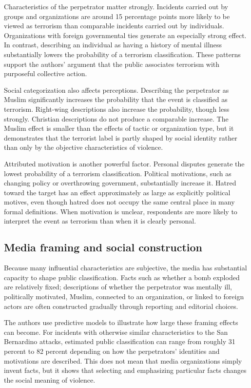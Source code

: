 Characteristics of the perpetrator matter strongly. Incidents carried out by groups and organizations are around 15 percentage points more likely to be viewed as terrorism than comparable incidents carried out by individuals. Organizations with foreign governmental ties generate an especially strong effect. In contrast, describing an individual as having a history of mental illness substantially lowers the probability of a terrorism classification. These patterns support the authors' argument that the public associates terrorism with purposeful collective action.

Social categorization also affects perceptions. Describing the perpetrator as Muslim significantly increases the probability that the event is classified as terrorism. Right-wing descriptions also increase the probability, though less strongly. Christian descriptions do not produce a comparable increase. The Muslim effect is smaller than the effects of tactic or organization type, but it demonstrates that the terrorist label is partly shaped by social identity rather than only by the objective characteristics of violence.

Attributed motivation is another powerful factor. Personal disputes generate the lowest probability of a terrorism classification. Political motivations, such as changing policy or overthrowing government, substantially increase it. Hatred toward the target has an effect approximately as large as explicitly political motives, even though hatred does not occupy the same central place in many formal definitions. When motivation is unclear, respondents are more likely to interpret the event as terrorism than when it is clearly personal.

\subsection{Media framing and social construction}

Because many influential characteristics are subjective, the media has substantial capacity to shape public classification. Facts such as whether a bomb exploded are relatively fixed; descriptions of whether the perpetrator was mentally ill, politically motivated, Muslim, connected to an organization, or linked to foreign actors are often constructed gradually through reporting and editorial choices.

The authors use predictive models to illustrate how large these framing effects can become. For incidents with otherwise similar characteristics to the San Bernardino attacks, estimated public classification can range from roughly 31 percent to 82 percent depending on how the perpetrators' identities and motivations are described. This does not mean that media organizations simply invent facts, but it shows that selecting and emphasizing particular facts changes the social meaning of violence.

